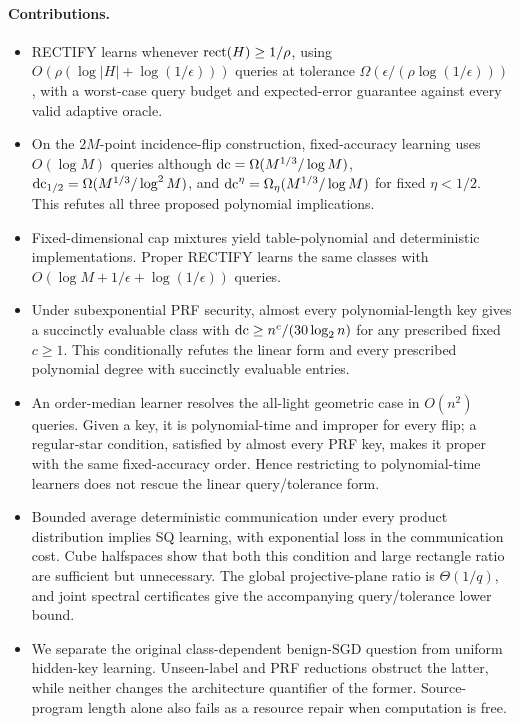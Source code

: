 \paragraph{Contributions.}
\begin{itemize}
\item RECTIFY learns whenever $\operatorname{rect}(H)\ge1/\rho$, using $O(\rho(\log|H|+\log(1/\epsilon)))$ queries at tolerance $\Omega(\epsilon/(\rho\log(1/\epsilon)))$, with a worst-case query budget and expected-error guarantee against every valid adaptive oracle.
\item On the $2M$-point incidence-flip construction, fixed-accuracy learning uses $O(\log M)$ queries although $\operatorname{dc}=\Omega(M^{1/3}/\log M)$, $\operatorname{dc}_{1/2}=\Omega(M^{1/3}/\log^2M)$, and $\operatorname{dc}^\eta=\Omega_\eta(M^{1/3}/\log M)$ for fixed $\eta<1/2$. This refutes all three proposed polynomial implications.
\item Fixed-dimensional cap mixtures yield table-polynomial and deterministic implementations. Proper RECTIFY learns the same classes with $O(\log M+1/\epsilon+\log(1/\epsilon))$ queries.
\item Under subexponential PRF security, almost every polynomial-length key gives a succinctly evaluable class with $\operatorname{dc}\ge n^c/(30\log_2n)$ for any prescribed fixed $c\ge1$. This conditionally refutes the linear form and every prescribed polynomial degree with succinctly evaluable entries.
\item An order-median learner resolves the all-light geometric case in $O(n^2)$ queries. Given a key, it is polynomial-time and improper for every flip; a regular-star condition, satisfied by almost every PRF key, makes it proper with the same fixed-accuracy order. Hence restricting to polynomial-time learners does not rescue the linear query/tolerance form.
\item Bounded average deterministic communication under every product distribution implies SQ learning, with exponential loss in the communication cost. Cube halfspaces show that both this condition and large rectangle ratio are sufficient but unnecessary. The global projective-plane ratio is $\Theta(1/q)$, and joint spectral certificates give the accompanying query/tolerance lower bound.
\item We separate the original class-dependent benign-SGD question from uniform hidden-key learning. Unseen-label and PRF reductions obstruct the latter, while neither changes the architecture quantifier of the former. Source-program length alone also fails as a resource repair when computation is free.
\end{itemize}


